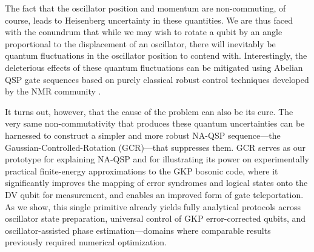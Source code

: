 \documentclass[aps,prx,showpacs,notitlepage,twocolumn,superscriptaddress,nofootinbib,preprintnumbers,floatfix,10pt, longbibliography]{revtex4-2}
\begin{document}
The fact that the oscillator position and momentum are non-commuting, of course, leads to Heisenberg uncertainty in these quantities.  We are thus faced with the conundrum that while we may wish to rotate a qubit by an angle proportional to the displacement of an oscillator, there will inevitably be quantum fluctuations in the oscillator position to contend with.  Interestingly, the deleterious effects of these quantum fluctuations can be mitigated using Abelian QSP gate sequences based on purely classical robust control techniques developed by the NMR community \cite{wimperis1994broadband}.  


It turns out, however, that the cause of the problem can also be its cure. The very same non-commutativity that produces these quantum uncertainties can be harnessed to construct a simpler and more robust NA-QSP sequence---the Gaussian-Controlled-Rotation (GCR)---that suppresses them. GCR serves as our prototype for explaining NA-QSP and for illustrating its power on experimentally practical finite-energy approximations to the GKP bosonic code, where it significantly improves the mapping of error syndromes and logical states onto the DV qubit for measurement, and enables an improved form of gate teleportation. As we show, this single primitive already yields fully analytical protocols across oscillator state preparation, universal control of GKP error-corrected qubits, and oscillator-assisted phase estimation---domains where comparable results previously required numerical optimization.
\end{document}
